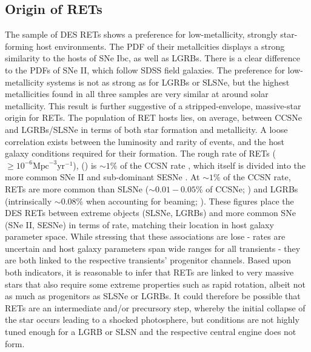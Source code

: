 \documentclass[fleqn,usenatbib,]{mnras}
\begin{document}
\subsection{Origin of RETs \label{subsec:disc_origin}}

The sample of DES RETs shows a preference for low-metallicity, strongly star-forming host environments. The PDF of their metallcities displays a strong similarity to the hosts of SNe Ibc, as well as LGRBs. There is a clear difference to the PDFs of SNe II, which follow SDSS field galaxies. The preference for low-metallicity systems is not as strong as for LGRBs or SLSNe, but the highest metallicities found in all three samples are very similar at around solar metallicity. This result is further suggestive of a stripped-envelope, massive-star origin for RETs. 
The population of RET hosts lies, on average, between CCSNe and LGRBs/SLSNe in terms of both star formation and metallicity. A loose correlation exists between the luminosity and rarity of events, and the host galaxy conditions required for their formation. The rough rate of RETs ($\geq 10^{-6} \mathrm{Mpc}^{-3} \mathrm{yr}^{-1}$), () is $\sim1\%$ of the CCSN rate \citep{Li2011,Horiuchi2011}, which itself is divided into the more common SNe II and sub-dominant SESNe \citep{Kelly2012,Frohmaier2020}. At $\sim1\%$ of the CCSN rate, RETs are more common than SLSNe ($\sim0.01 - 0.05\%$ of CCSNe; \citealt{McCrum2015,Prajz2016,Frohamier2020}) and LGRBs (intrinsically $\sim0.08\%$ when accounting for beaming; \citealt{Graham2016}). These figures place the DES RETs between extreme objects (SLSNe, LGRBs) and more common SNe (SNe II, SESNe) in terms of rate, matching their location in host galaxy parameter space. While stressing that these associations are lose - rates are uncertain and host galaxy parameters span wide ranges for all transients - they are both linked to the respective transients' progenitor channels. Based upon both indicators, it is reasonable to infer that RETs are linked to very massive stars that also require some extreme properties such as rapid rotation, albeit not as much as progenitors as SLSNe or LGRBs. It could therefore be possible that RETs are an intermediate and/or precursory step, whereby the initial collapse of the star occurs leading to a shocked photosphere, but conditions are not highly tuned enough for a LGRB or SLSN and the respective central engine does not form. 
\end{document}
